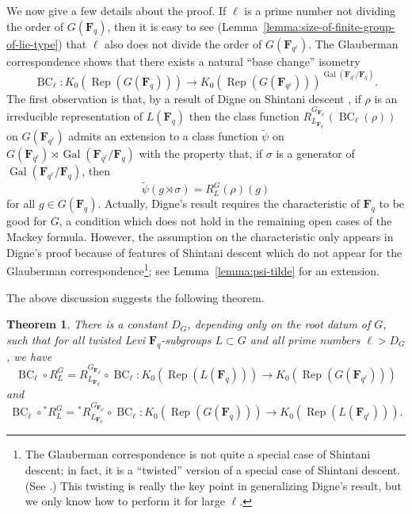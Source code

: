 \documentclass[11pt,reqno]{amsart}
\newtheorem{theorem}{Theorem}[section]
\theoremstyle{definition}
\newcommand{\F}{{\mathbf F}}
\DeclareMathOperator{\BC}{BC}
\DeclareMathOperator{\Gal}{Gal}
\DeclareMathOperator{\Rep}{Rep}
\begin{document}
We now give a few details about the proof. If $\ell$ is a prime number not dividing the order of $G(\F_q)$, then it is easy to see (Lemma~\ref{lemma:size-of-finite-group-of-lie-type}) that $\ell$ also does not divide the order of $G(\F_{q^\ell})$. The Glauberman correspondence \cite[Theorem 3]{Gla68} shows that there exists a natural ``base change'' isometry
\[
\BC_\ell\colon K_0(\Rep(G(\F_q))) \to K_0(\Rep(G(\F_{q^\ell})))^{\Gal(\F_{q^\ell}/\F_q)}.
\]
The first observation is that, by a result of Digne on Shintani descent \cite[Corollaire 3.5]{Dig99}, if $\rho$ is an irreducible representation of $L(\F_q)$ then the class function $R_{L_{\F_{q^\ell}}}^{G_{\F_{q^\ell}}}(\BC_\ell(\rho))$ on $G(\F_{q^\ell})$ admits an extension to a class function $\widetilde\psi$ on $G(\F_{q^\ell}) \rtimes \Gal(\F_{q^\ell}/\F_q)$ with the property that, if $\sigma$ is a generator of $\Gal(\F_{q^\ell}/\F_q)$, then
\[
\widetilde\psi(g \rtimes \sigma) = R_L^G(\rho)(g)
\]
for all $g \in G(\F_q)$. Actually, Digne's result requires the characteristic of $\F_q$ to be good for $G$, a condition which does not hold in the remaining open cases of the Mackey formula. However, the assumption on the characteristic only appears in Digne's proof because of features of Shintani descent which do not appear for the Glauberman correspondence\footnote{The Glauberman correspondence is not quite a special case of Shintani descent; in fact, it is a ``twisted'' version of a special case of Shintani descent. (See \cite[Corollaire 2.5]{Dig86}.) This twisting is really the key point in generalizing Digne's result, but we only know how to perform it for large $\ell$.}; see Lemma~\ref{lemma:psi-tilde} for an extension.

The above discussion suggests the following theorem.

\begin{theorem}\label{thm:base-change-commutes-with-lusztig-induction}
    There is a constant $D_G$, depending only on the root datum of $G$, such that for all twisted Levi $\F_q$-subgroups $L \subset G$ and all prime numbers $\ell > D_G$, we have
    \begin{equation}\label{eqn:bc-commutes-with-dl-induction}
    \BC_\ell \circ R_L^G = R_{L_{\F_{q^\ell}}}^{G_{\F_{q^\ell}}} \circ \BC_\ell\colon K_0(\Rep(L(\F_q))) \to K_0(\Rep(G(\F_{q^\ell})))
    \end{equation}
    and
    \begin{equation}\label{eqn:bc-commutes-with-dl-restriction}
    \BC_\ell \circ {}^*R^G_L = {}^*R^{G_{\F_{q^\ell}}}_{L_{\F_{q^\ell}}} \circ \BC_\ell\colon K_0(\Rep(G(\F_q))) \to K_0(\Rep(L(\F_{q^\ell}))).
    \end{equation}
\end{theorem}
\end{document}
